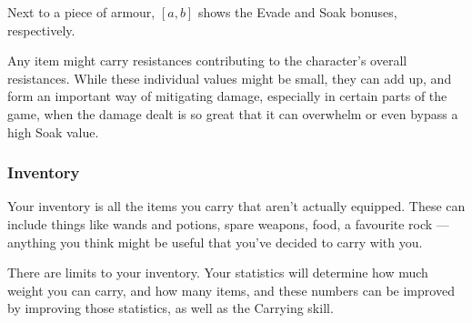 Next to a piece of armour, \([a, b]\) shows the Evade and Soak bonuses,
respectively.

Any item might carry resistances contributing to the character's overall
resistances.  While these individual values might be small, they can add up,
and form an important way of mitigating damage, especially in certain parts
of the game, when the damage dealt is so great that it can overwhelm or even
bypass a high Soak value.

\subsubsection{Inventory}

Your inventory is all the items you carry that aren't actually equipped.
These can include things like wands and potions, spare weapons, food, a
favourite rock --- anything you think might be useful that you've decided
to carry with you.  

There are limits to your inventory. Your statistics will determine how much
weight you can carry, and how many items, and these numbers can be improved
by improving those statistics, as well as the Carrying skill.
